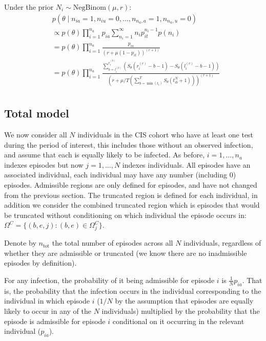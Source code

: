 \documentclass[thesis.tex]{subfiles}
\begin{document}
Under the prior $N_i \sim \text{NegBinom}(\mu, r)$:
\begin{align}
&p(\theta \mid n_{ia} = 1, n_{iu} = 0, \dots, n_{n_a,a} = 1, n_{n_a,u} = 0) \\
&\propto p(\theta) \prod_{i=1}^{n_a} p_{ia} \sum_{n_i=1}^\infty n_i p_{it}^{n_i- 1} p(n_i) \\
&= p(\theta) \prod_{i=1}^{n_a} \frac{p_{ia}}{(r+\mu (1-p_{it}))^{(r+1)}} \\
&= p(\theta) \prod_{i=1}^{n_a} \frac{\sum_{b=l_i^{(b)}}^{r_i^{(b)}} \left( S_\theta(r_i^{(e)} - b - 1) - S_\theta(l_i^{(e)} - b - 1) \right)}{\left( r+\mu/T \left( \sum_{b=\min(t_i)}^T S_\theta(t_{ib}^N + 1) \right) \right)^{(r+1)}} \\
\end{align}

\subsection{Total model}\label{perf-test:sec:total-model}

We now consider all $N$ individuals in the CIS cohort who have at
least one test during the period of interest, this includes those
without an observed infection, and assume that each is equally likely to
be infected. As before, $i = 1, \dots, n_a$ indexes episodes but now
$j = 1, \dots, N$ indexes individuals. All episodes have an associated
individual, each individual may have any number (including 0) episodes.
Admissible regions are only defined for episodes, and have not changed
from the previous section. The truncated region is defined for each
individual, in addition we consider the combined truncated region which
is episodes that would be truncated without conditioning on which
individual the episode occurs in:
$\Omega^C = \{ (b, e, j) : (b, e) \in \Omega_j^C \}$.

Denote by $n_\text{tot}$ the total number of episodes across all $N$
individuals, regardless of whether they are admissible or truncated (we
know there are no inadmissible episodes by definition).

For any infection, the probability of it being admissible for episode
$i$ is $\frac{1}{N} p_{ia}$. That is, the probability that the
infection occurs in the individual corresponding to the individual in
which episode $i$ ($1/N$ by the assumption that episodes are equally
likely to occur in any of the $N$ individuals) multiplied by the
probability that the episode is admissible for episode $i$ conditional
on it occurring in the relevant individual ($p_{ia}$).
\end{document}
